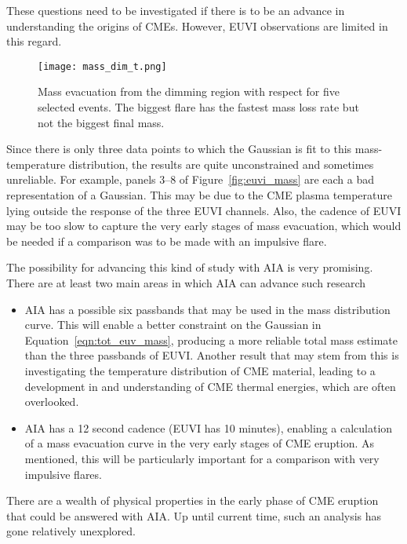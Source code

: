 These questions need to be investigated if there is to be an advance in understanding the origins of CMEs. However, EUVI observations are limited in this regard.
\begin{figure}[t!]
\begin{center}
\texttt{[image: mass\_dim\_t.png]}
\caption[Mass evacuation with time]{Mass evacuation from the dimming region with respect for five selected events. The biggest flare has the fastest mass loss rate but not the biggest final mass. \citep{aschw09}}
\label{fig:mass_dim_time}
\end{center}
\end{figure}
Since there is only three data points to which the Gaussian is fit to this mass-temperature distribution, the results are quite unconstrained and sometimes unreliable. For example, panels 3--8 of Figure~\ref{fig:euvi_mass} are each a bad representation of a Gaussian. This may be due to the CME plasma temperature lying outside the response of the three EUVI channels. Also, the cadence of EUVI may be too slow to capture the very early stages of mass evacuation, which would be needed if a comparison was to be made with an impulsive flare.

The possibility for advancing this kind of study with AIA is very promising. There are at least two main areas in which AIA can advance such research
\begin{itemize}
\item AIA has a possible six passbands that may be used in the mass distribution curve. This will enable a better constraint on the Gaussian in Equation~\ref{eqn:tot_euv_mass}, producing a more reliable total mass estimate than the three passbands of EUVI. Another result that may stem from this is investigating the temperature distribution of CME material, leading to a development in and understanding of CME thermal energies, which are often overlooked.
\item AIA has a 12 second cadence (EUVI has 10 minutes), enabling a calculation of a mass evacuation curve in the very early stages of CME eruption. As mentioned, this will be particularly important for a comparison with very impulsive flares.
\end{itemize}
There are a wealth of physical properties in the early phase of CME eruption that could be answered with AIA. Up until current time, such an analysis has gone relatively unexplored.

